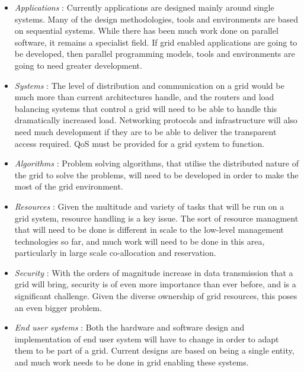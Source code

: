 \begin{itemize}

  \item{\emph{Applications}} : Currently applications are designed mainly
    around single systems.  Many of the design methodologies, tools and
    environments are based on sequential systems.  While there has been much
    work done on parallel software, it remains a specialist field.  If grid
    enabled applications are going to be developed, then parallel programming
    models, tools and environments are going to need greater development.

  \item{\emph{Systems}} : The level of distribution and communication on a grid
    would be much more than current architectures handle, and the routers and
    load balancing systems that control a grid will need to be able to handle
    this dramatically increased load.   Networking protocols and infrastructure
    will also need much development if they are to be able to deliver the
    transparent access required. QoS must be provided for a grid system to
    function.

  \item{\emph{Algorithms}} : Problem solving algorithms, that utilise the
    distributed nature of the grid to solve the problems, will need to be
    developed in order to make the most of the grid environment.

  \item{\emph{Resources}} : Given the multitude and variety of tasks that will
    be run on a grid system, resource handling is a key issue.  The sort of
    resource managment that will need to be done is different in scale to the
    low-level management technologies so far, and much work will need to be
    done in this area, particularly in large scale co-allocation and
    reservation.

  \item{\emph{Security}} : With the orders of magnitude increase in data
    transmission that a grid will bring, security is of even more importance
    than ever before, and is a significant challenge.  Given the diverse
    ownership of grid resources, this poses an even bigger problem.

  \item{\emph{End user systems}} : Both the hardware and software design and
    implementation of end user system will have to change in order to adapt
    them to be part of a grid.  Current designs are based on being a single
    entity, and much work needs to be done in grid enabling these systems.

\end{itemize}



